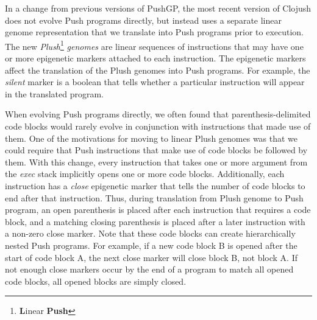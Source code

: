 In a change from previous versions of PushGP, the most recent version of Clojush does not evolve Push programs directly, but instead uses a separate linear genome representation that we translate into Push programs prior to execution. The new \textit{Plush}\footnote{\textbf{L}inear \textbf{Push}} \textit{genomes} are linear sequences of instructions that may have one or more epigenetic markers attached to each instruction. The epigenetic markers affect the translation of the Plush genomes into Push programs. For example, the \textit{silent} marker is a boolean that tells whether a particular instruction will appear in the translated program.

When evolving Push programs directly, we often found that parenthesis-delimited code blocks would rarely evolve in conjunction with instructions that made use of them. One of the motivations for moving to linear Plush genomes was that we could require that Push instructions that make use of code blocks be followed by them. With this change, every instruction that takes one or more argument from the \textit{exec} stack implicitly opens one or more code blocks. Additionally, each instruction has a \textit{close} epigenetic marker that tells the number of code blocks to end after that instruction. Thus, during translation from Plush genome to Push program, an open parenthesis is placed after each instruction that requires a code block, and a matching closing parenthesis is placed after a later instruction with a non-zero close marker. Note that these code blocks can create hierarchically nested Push programs. For example, if a new code block B is opened after the start of code block A, the next close marker will close block B, not block A. If not enough close markers occur by the end of a program to match all opened code blocks, all opened blocks are simply closed.

